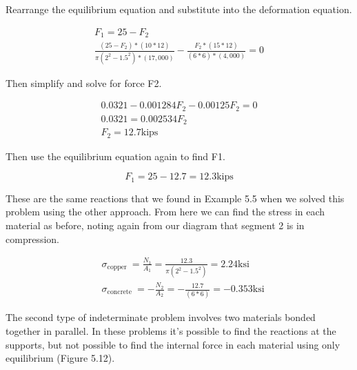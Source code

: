\documentclass[
  letterpaper,
  DIV=11,
  numbers=noendperiod]{scrreprt}
\begin{document}
\begin{tcolorbox}
\begin{tcolorbox}
Rearrange the equilibrium equation and substitute into the deformation
equation.

\[
\begin{gathered}
F_1=25-F_2 \\
\frac{\left(25-F_2\right) *(10 * 12)}{\pi\left(2^2-1.5^2\right) *(17,000)}-\frac{F_2 *(15 * 12)}{(6 * 6) *(4,000)}=0
\end{gathered}
\]

Then simplify and solve for force F2.

\[
\begin{gathered}
0.0321-0.001284 F_2-0.00125 F_2=0 \\
0.0321=0.002534 F_2 \\
F_2=12.7 \mathrm{kips}
\end{gathered}
\]

Then use the equilibrium equation again to find F1.

\[
F_1=25-12.7=12.3 \mathrm{kips}
\]

These are the same reactions that we found in Example 5.5 when we solved
this problem using the other approach. From here we can find the stress
in each material as before, noting again from our diagram that segment 2
is in compression.

\[
\begin{aligned}
& \sigma_{\text {copper }}=\frac{N_1}{A_1}=\frac{12.3}{\pi\left(2^2-1.5^2\right)}=2.24 \mathrm{ksi} \\
& \sigma_{\text {concrete }}=-\frac{N_2}{A_2}=-\frac{12.7}{(6 * 6)}=-0.353 \mathrm{ksi}
\end{aligned}
\]

\end{tcolorbox}

\end{tcolorbox}

The second type of indeterminate problem involves two materials bonded
together in parallel. In these problems it's possible to find the
reactions at the supports, but not possible to find the internal force
in each material using only equilibrium (Figure 5.12).
\end{document}
